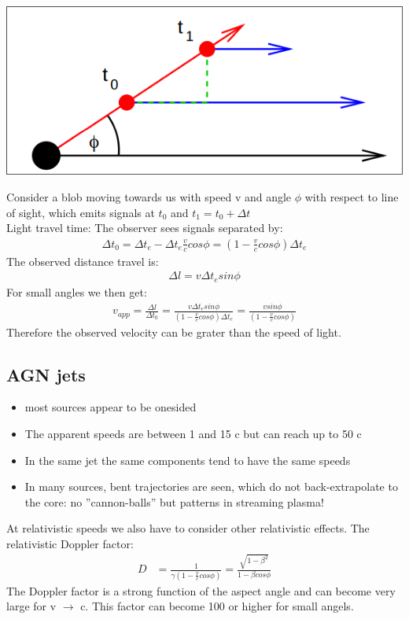 \documentclass[11pt,a4paper]{article}
\begin{document}
\begin{center}
    \includegraphics[width=0.6\linewidth]{screenshot_2024-01-26-154432.png}
\end{center}
Consider a blob moving towards us with speed v and angle $\phi$ with respect to line of sight, which
emits signals at $t_0$ and $t_1 = t_0 + \Delta t$ \\ 
Light travel time: The observer sees signals separated by:
\begin{align*}
   \Delta t_0 = \Delta t_e - \Delta t_e \frac v c cos \phi  = (1 - \frac v c cos \phi) \Delta t_e
\end{align*}
The observed distance travel is:
\begin{align*}
   \Delta l = v \Delta t_e sin \phi  
\end{align*}
For small angles we then get:
\begin{align*}
    v_{app }  = \frac {\Delta l}{\Delta t_0 } = \frac {v \Delta t_e sin \phi }{(1 - \frac v c cos \phi)\Delta t_e} = \frac {v sin \phi }{(1 - \frac v c cos \phi)}
\end{align*}
Therefore the observed velocity can be grater than the speed of light. 

\subsection{AGN jets}
\begin{itemize}
    \item most sources appear to be onesided 
    \item The apparent speeds are between 1 and 15 c but can reach up to 50 c
    \item In the same jet the same components tend to have the same speeds
    \item In many sources, bent trajectories are seen, which do not
back-extrapolate to the core: no ”cannon-balls” but patterns in
streaming plasma!
\end{itemize}
At relativistic speeds we also have to consider other relativistic effects. 
The relativistic Doppler factor:
\begin{align*}
    D &= \frac 1 {\gamma (1 - \frac v c cos \phi)} = \frac {\sqrt{1-\beta^2}}{1 - \beta cos \phi}
\end{align*}
The Doppler factor is a strong function of the aspect angle and can become very large for v $\rightarrow$ c.
This factor can become 100 or higher for small angels.
\end{document}
